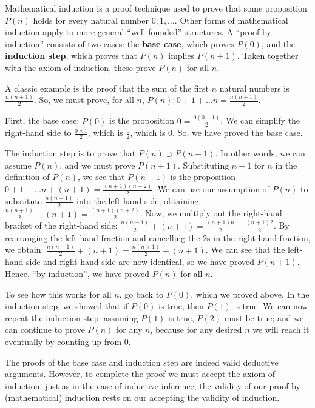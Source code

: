 \documentclass[english]{scrartcl}
\begin{document}
Mathematical induction is a proof technique used to prove that some proposition $P(n)$ holds for every natural number $0, 1,…$. Other forms of mathematical induction apply to more general “well-founded” structures. A “proof by induction” consists of two cases: the \textbf{base case}, which proves $P(0)$, and the \textbf{induction step}, which proves that $P(n)$ implies $P(n+1)$. Taken together with the axiom of induction, these prove $P(n)$ for all $n$.

A classic example is the proof that the sum of the first $n$ natural numbers is $\frac{n(n+1)}{2}$. So, we must prove, for all $n$, $P(n): 0+1+…n = \frac{n(n+1)}{2}$.

First, the base case: $P(0)$ is the proposition $0 = \frac{0(0+1)}{2}$. We can simplify the right-hand side to $\frac{0×1}{2}$, which is $\frac{0}{2}$, which is $0$. So, we have proved the base case.

The induction step is to prove that $P(n)\supset P(n+1)$. In other words, we can assume $P(n)$, and we must prove $P(n+1)$. Substituting $n+1$ for $n$ in the definition of $P(n)$, we see that $P(n+1)$ is the proposition $0+1+…n+(n+1) = \frac{(n+1)(n+2)}{2}$. We can use our assumption of $P(n)$ to substitute $\frac{n(n+1)}{2}$ into the left-hand side, obtaining: $\frac{n(n+1)}{2}+(n+1) = \frac{(n+1)(n+2)}{2}$. Now, we multiply out the right-hand bracket of the right-hand side: $\frac{n(n+1)}{2}+(n+1) = \frac{(n+1)n}{2} + \frac{(n+1)2}{2}$. By rearranging the left-hand fraction and cancelling the $2$s in the right-hand fraction, we obtain: $\frac{n(n+1)}{2}+(n+1) = \frac{n(n+1)}{2} + (n+1)$. We can see that the left-hand side and right-hand side are now identical, so we have proved $P(n+1)$. Hence, “by induction”, we have proved $P(n)$ for all $n$.

To see how this works for all $n$, go back to $P(0)$, which we proved above. In the induction step, we showed that if $P(0)$ is true, then $P(1)$ is true. We can now repeat the induction step: assuming $P(1)$ is true, $P(2)$ must be true; and we can continue to prove $P(n)$ for any $n$, because for any desired $n$ we will reach it eventually by counting up from $0$.

The proofs of the base case and induction step are indeed valid deductive arguments. However, to complete the proof we must accept the axiom of induction: just as in the case of inductive inference, the validity of our proof by (mathematical) induction rests on our accepting the validity of induction.
\end{document}

